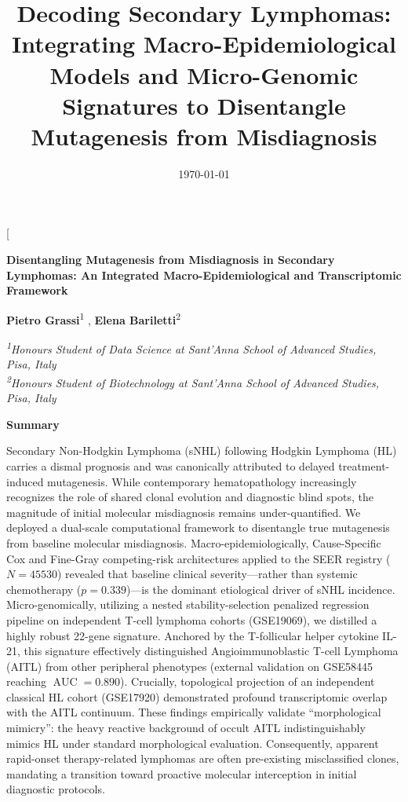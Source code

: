 \documentclass[a4paper,11pt,twocolumn]{article}
\title{Decoding Secondary Lymphomas: Integrating Macro-Epidemiological Models and Micro-Genomic Signatures to Disentangle Mutagenesis from Misdiagnosis}
\date{\today}
\begin{document}
	
	\makeatletter
	\twocolumn[
	\begin{@twocolumnfalse}
		\begin{center}
			\vspace*{-0.5cm}
			{\Large \textbf{Disentangling Mutagenesis from Misdiagnosis in Secondary Lymphomas: An Integrated Macro-Epidemiological and Transcriptomic Framework}}
			
			\vspace{0.8cm}
			
			{\small 
				\textbf{Pietro Grassi}\textsuperscript{1} ,
				\textbf{Elena Bariletti}\textsuperscript{2} 
			}
			
			\vspace{0.3cm}
			
			{\footnotesize 
				\textit{\textsuperscript{1}Honours Student of Data Science at Sant'Anna School of Advanced Studies, Pisa, Italy} \\
				\textit{\textsuperscript{2}Honours Student of Biotechnology at Sant'Anna School of Advanced Studies, Pisa, Italy} \\
			}
			
			\vspace{0.8cm}
			
			\begin{minipage}{0.88\textwidth}
				\small \textbf{Summary}
				
				\vspace{0.2cm}
				
				Secondary Non-Hodgkin Lymphoma (sNHL) following Hodgkin Lymphoma (HL) carries a dismal prognosis and was canonically attributed to delayed treatment-induced mutagenesis. While contemporary hematopathology increasingly recognizes the role of shared clonal evolution and diagnostic blind spots, the magnitude of initial molecular misdiagnosis remains under-quantified. We deployed a dual-scale computational framework to disentangle true mutagenesis from baseline molecular misdiagnosis. Macro-epidemiologically, Cause-Specific Cox and Fine-Gray competing-risk architectures applied to the SEER registry ($N=\num{45530}$) revealed that baseline clinical severity—rather than systemic chemotherapy ($p=0.339$)—is the dominant etiological driver of sNHL incidence. Micro-genomically, utilizing a nested stability-selection penalized regression pipeline on independent T-cell lymphoma cohorts (GSE19069), we distilled a highly robust 22-gene signature. Anchored by the T-follicular helper cytokine IL-21, this signature effectively distinguished Angioimmunoblastic T-cell Lymphoma (AITL) from other peripheral phenotypes (external validation on GSE58445 reaching $\operatorname{AUC} = 0.890$). Crucially, topological projection of an independent classical HL cohort (GSE17920) demonstrated profound transcriptomic overlap with the AITL continuum. These findings empirically validate ``morphological mimicry'': the heavy reactive background of occult AITL indistinguishably mimics HL under standard morphological evaluation. Consequently, apparent rapid-onset therapy-related lymphomas are often pre-existing misclassified clones, mandating a transition toward proactive molecular interception in initial diagnostic protocols.
				

\end{minipage}
\end{center}
\end{@twocolumnfalse}
\end{document}
